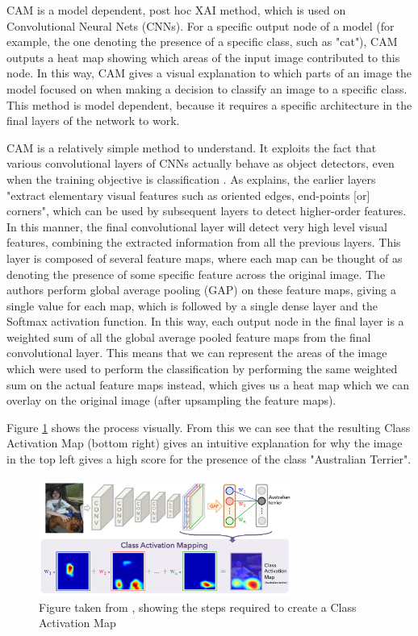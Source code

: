 \documentclass[UKenglish]{uiomasterthesis} %
\theoremstyle{definition}
\begin{document}
CAM \cite{cam} is a model dependent, post hoc XAI method, which is used on Convolutional Neural Nets (CNNs). For a specific output node of a model (for example, the one denoting the presence of a specific class, such as "cat"), CAM outputs a heat map showing which areas of the input image contributed to this node. In this way, CAM gives a visual explanation to which parts of an image the model focused on when making a decision to classify an image to a specific class. This method is model dependent, because it requires a specific architecture in the final layers of the network to work.

CAM is a relatively simple method to understand. It exploits the fact that various convolutional layers of CNNs actually behave as object detectors, even when the training objective is classification \cite{cam}. As \cite{lenet5} explains, the earlier layers "extract elementary visual features such as oriented edges, end-points [or] corners", which can be used by subsequent layers to detect higher-order features. In this manner, the final convolutional layer will detect very high level visual features, combining the extracted information from all the previous layers. This layer is composed of several feature maps, where each map can be thought of as denoting the presence of some specific feature across the original image. The authors perform global average pooling (GAP) on these feature maps, giving a single value for each map, which is followed by a single dense layer and the Softmax activation function. In this way, each output node in the final layer is a weighted sum of all the global average pooled feature maps from the final convolutional layer. This means that we can represent the areas of the image which were used to perform the classification by performing the same weighted sum on the actual feature maps instead, which gives us a heat map which we can overlay on the original image (after upsampling the feature maps).

Figure \ref{camimg} shows the process visually. From this we can see that the resulting Class Activation Map (bottom right) gives an intuitive explanation for why the image in the top left gives a high score for the presence of the class "Australian Terrier".

\begin{figure}[h]
\centerline{\includegraphics[width=3.25in]{figure/cam.pdf}}
\caption{Figure taken from \cite{cam}, showing the steps required to create a Class Activation Map}
\label{camimg}
\end{figure}
\end{document}
